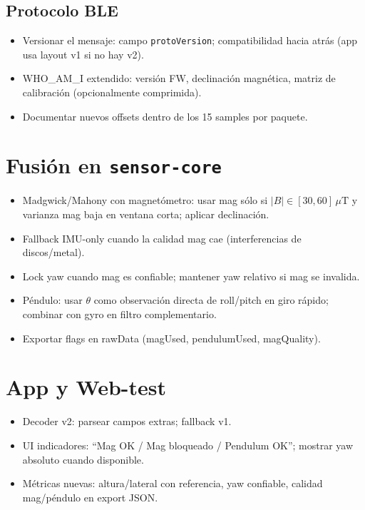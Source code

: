 \documentclass[11pt,a4paper]{article}
\begin{document}
\subsection{Protocolo BLE}
\begin{itemize}[leftmargin=12pt]
  \item Versionar el mensaje: campo \texttt{protoVersion}; compatibilidad hacia atr\'as (app usa layout v1 si no hay v2).
  \item WHO\_AM\_I extendido: versi\'on FW, declinaci\'on magn\'etica, matriz de calibraci\'on (opcionalmente comprimida).
  \item Documentar nuevos offsets dentro de los 15 samples por paquete.
\end{itemize}

\section{Fusi\'on en \texttt{sensor-core}}
\begin{itemize}[leftmargin=12pt]
  \item Madgwick/Mahony con magnet\'ometro: usar mag s\'olo si \(|B|\in[30,60]\,\mu\text{T}\) y varianza mag baja en ventana corta; aplicar declinaci\'on.
  \item Fallback IMU-only cuando la calidad mag cae (interferencias de discos/metal).
  \item Lock yaw cuando mag es confiable; mantener yaw relativo si mag se invalida.
  \item P\'endulo: usar \(\theta\) como observaci\'on directa de roll/pitch en giro r\'apido; combinar con gyro en filtro complementario.
  \item Exportar flags en rawData (magUsed, pendulumUsed, magQuality).
\end{itemize}

\section{App y Web-test}
\begin{itemize}[leftmargin=12pt]
  \item Decoder v2: parsear campos extras; fallback v1.
  \item UI indicadores: “Mag OK / Mag bloqueado / Pendulum OK”; mostrar yaw absoluto cuando disponible.
  \item M\'etricas nuevas: altura/lateral con referencia, yaw confiable, calidad mag/p\'endulo en export JSON.
\end{itemize}
\end{document}
